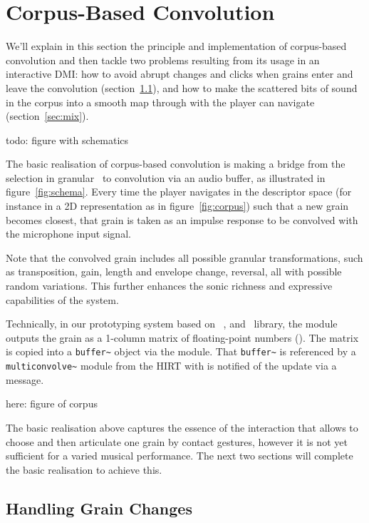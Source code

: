 \section{Corpus-Based Convolution} %

We'll explain in this section the principle and implementation of corpus-based convolution and then tackle two problems resulting from its usage in an interactive DMI: 
how to avoid abrupt changes and clicks when grains enter and leave the convolution (section~\ref{sec:set}), and
how to make the scattered bits of sound in the corpus into a smooth map through with the player can navigate (section~\ref{sec:mix}).


todo: figure with schematics

The basic realisation of corpus-based convolution is making a bridge from the selection in granular \cbcs\ to convolution via an audio buffer, as illustrated in figure~\ref{fig:schema}.  Every time the player navigates in the descriptor space (for instance in a 2D representation as in figure~\ref{fig:corpus}) such that a new grain becomes closest, that grain is taken as an impulse response to be convolved with the microphone input signal.

Note that the convolved grain includes all possible granular transformations, such as transposition, gain, length and envelope change, reversal, all with possible random variations.
This further enhances the sonic richness and expressive capabilities of the system.

Technically, in our prototyping system based on \catart\, \ftm{}, and \gabor\ library, the  module outputs the grain as a 1-column matrix of floating-point numbers ().  The matrix is copied into a \verb|buffer~| object via the  module.
That \verb|buffer~| is referenced by a \verb|multiconvolve~| module from the HIRT with is notified of the update via a message.

here: figure of corpus

The basic realisation above captures the essence of the interaction that allows to choose and then articulate one grain by contact gestures, however it is not yet sufficient for a varied musical performance.  The next two sections will complete the basic realisation to achieve this.


\subsection{Handling Grain Changes}\label{sec:set}

